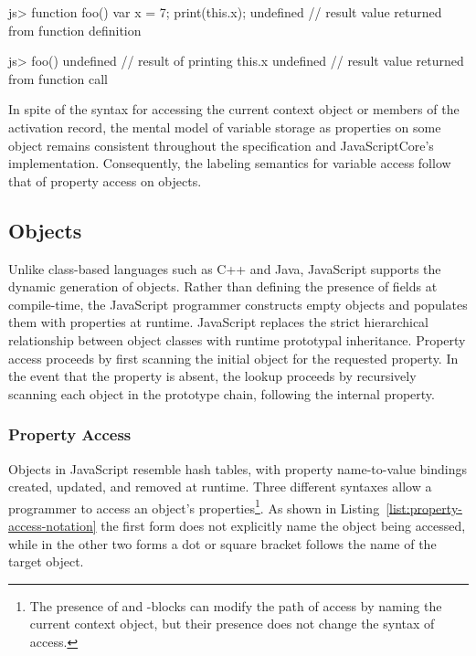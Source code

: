 \begin{jscode}
js> function foo() {
      var x = 7;
      print(this.x);
    }
undefined // result value returned from function definition

js> foo()
undefined // result of printing this.x
undefined // result value returned from function call
\end{jscode}

In spite of the syntax for accessing the current context object or members of the activation record, the mental model of variable storage as properties on some object remains consistent throughout the specification and JavaScriptCore's implementation.
Consequently, the labeling semantics for variable access follow that of property access on objects.

\subsection{Objects}

Unlike class-based languages such as C++ and Java, JavaScript supports the dynamic generation of objects.
Rather than defining the presence of fields at compile-time, the JavaScript programmer constructs empty objects and populates them with properties at runtime.
JavaScript replaces the strict hierarchical relationship between object classes with runtime prototypal inheritance.
Property access proceeds by first scanning the initial object for the requested property.
In the event that the property is absent, the lookup proceeds by recursively scanning each object in the prototype chain, following the internal  property.

\subsubsection{Property Access}

Objects in JavaScript resemble hash tables, with property name-to-value bindings created, updated, and removed at runtime.
Three different syntaxes allow a programmer to access an object's properties\footnote{The presence of  and -blocks can modify the path of access by naming the current context object, but their presence does not change the syntax of access.}.
As shown in Listing~\ref{list:property-access-notation} the first form does not explicitly name the object being accessed, while in the other two forms a dot or square bracket follows the name of the target object.

